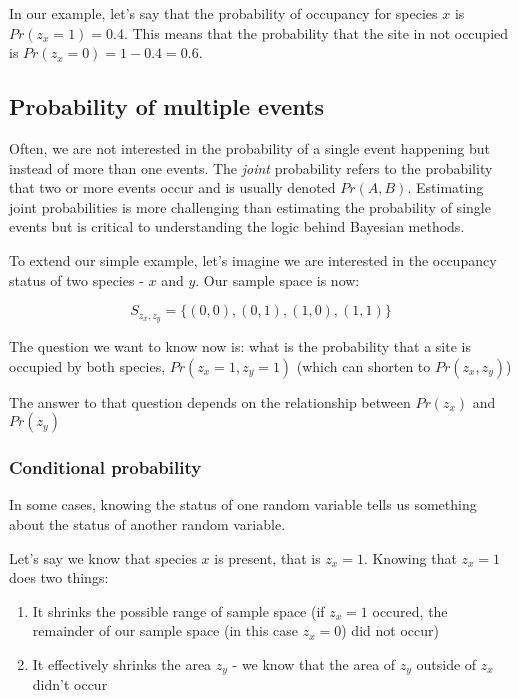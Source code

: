 \documentclass[]{article}
\begin{document}
In our example, let's say that the probability of occupancy for species
\(x\) is \(Pr(z_x = 1) = 0.4\). This means that the probability that the
site in not occupied is \(Pr(z_x = 0) =1-0.4=0.6\).

\hypertarget{probability-of-multiple-events}{%
\subsection{Probability of multiple
events}\label{probability-of-multiple-events}}

Often, we are not interested in the probability of a single event
happening but instead of more than one events. The \emph{joint}
probability refers to the probability that two or more events occur and
is usually denoted \(Pr(A,B)\). Estimating joint probabilities is more
challenging than estimating the probability of single events but is
critical to understanding the logic behind Bayesian methods.

To extend our simple example, let's imagine we are interested in the
occupancy status of two species - \(x\) and \(y\). Our sample space is
now:

\[S_{z_x,z_y} = \{(0,0), (0,1), (1,0), (1,1)\}\]

The question we want to know now is: what is the probability that a site
is occupied by both species, \(Pr(z_x = 1, z_y = 1)\) (which can shorten
to \(Pr(z_x, z_y)\))

The answer to that question depends on the relationship between
\(Pr(z_x)\) and \(Pr(z_y)\)

\hypertarget{conditional-probability}{%
\subsubsection{Conditional probability}\label{conditional-probability}}

In some cases, knowing the status of one random variable tells us
something about the status of another random variable.

Let's say we know that species \(x\) is present, that is \(z_x=1\).
Knowing that \(z_x=1\) does two things:

\begin{enumerate}
\def\labelenumi{\arabic{enumi})}
\item
  It shrinks the possible range of sample space (if \(z_x=1\) occured,
  the remainder of our sample space (in this case \(z_x=0\)) did not
  occur)
\item
  It effectively shrinks the area \(z_y\) - we know that the area of
  \(z_y\) outside of \(z_x\) didn't occur
\end{enumerate}
\end{document}
